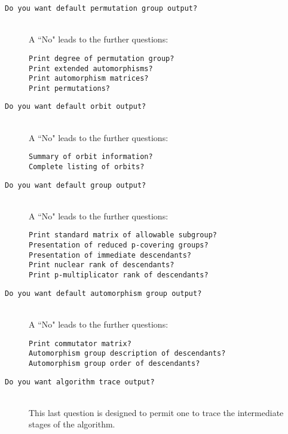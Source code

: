 \documentclass[12pt]{article}
\begin{document}
\begin{description}
 \enlargethispage*{1\baselineskip}
 \begin{description}
 \item[\texttt{Do you want default permutation group output?}]\ \\
 A ``No" leads to the further questions:
  \begin{description}
   \item[\texttt{Print degree of permutation group?}]
   \item[\texttt{Print extended automorphisms?}]
   \item[\texttt{Print automorphism matrices?}]
   \item[\texttt{Print permutations?}]
  \end{description}
 \item[\texttt{Do you want default orbit output?}]\ \\
 A ``No" leads to the further questions:
  \begin{description}
   \item[\texttt{Summary of orbit information?}]
   \item[\texttt{Complete listing of orbits?}]
  \end{description}
 \item[\texttt{Do you want default group output?}]\ \\
 A ``No" leads to the further questions:
  \begin{description}
   \item[\texttt{Print standard matrix of allowable subgroup?}]
   \item[\texttt{Presentation of reduced p-covering groups?}]
   \item[\texttt{Presentation of immediate descendants?}]
   \item[\texttt{Print nuclear rank of descendants?}]
   \item[\texttt{Print p-multiplicator rank of descendants?}]
  \end{description}
 \item[\texttt{Do you want default automorphism group output?}]\ \\
 A ``No" leads to the further questions:
  \begin{description}
   \item[\texttt{Print commutator matrix?}]
   \item[\texttt{Automorphism group description of descendants?}]
   \item[\texttt{Automorphism group order of descendants?}]
  \end{description}
 \item[\texttt{Do you want algorithm trace output?}]\ \\
 This last question is designed to permit
 one to trace the intermediate stages of the algorithm.
 \end{description}
\end{description}
\end{document}
